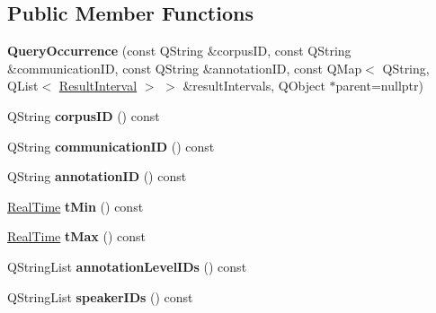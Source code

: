 \subsection*{Public Member Functions}
\begin{DoxyCompactItemize}
\item 
\mbox{\label{class_query_occurrence_a5bd6db4a53e9beababb1474586b5e0a9}} 
{\bfseries Query\+Occurrence} (const Q\+String \&corpus\+ID, const Q\+String \&communication\+ID, const Q\+String \&annotation\+ID, const Q\+Map$<$ Q\+String, Q\+List$<$ \hyperlink{class_query_occurrence_1_1_result_interval}{Result\+Interval} $>$ $>$ \&result\+Intervals, Q\+Object $\ast$parent=nullptr)
\item 
\mbox{\label{class_query_occurrence_a7125781585344e22da921fa5b60d058e}} 
Q\+String {\bfseries corpus\+ID} () const
\item 
\mbox{\label{class_query_occurrence_a5dff74ee1417eb35c8e8717d4bb0212b}} 
Q\+String {\bfseries communication\+ID} () const
\item 
\mbox{\label{class_query_occurrence_a50f742ab08b343132face0d2a6e03100}} 
Q\+String {\bfseries annotation\+ID} () const
\item 
\mbox{\label{class_query_occurrence_a901aacc920fd3eaf0b183cc1393d001a}} 
\hyperlink{struct_real_time}{Real\+Time} {\bfseries t\+Min} () const
\item 
\mbox{\label{class_query_occurrence_a6482d468dec6f825b4b7dc3102b8116a}} 
\hyperlink{struct_real_time}{Real\+Time} {\bfseries t\+Max} () const
\item 
\mbox{\label{class_query_occurrence_a3f648d01cb9b42545a26f641d69ff6a8}} 
Q\+String\+List {\bfseries annotation\+Level\+I\+Ds} () const
\item 
\mbox{\label{class_query_occurrence_af3ff918021b120d961278729e157ea26}} 
Q\+String\+List {\bfseries speaker\+I\+Ds} () const
\item 
\mbox{\label{class_query_occurrence_a9af9185d36e9124f19d73df8ec813970}} 

\end{DoxyCompactItemize}
